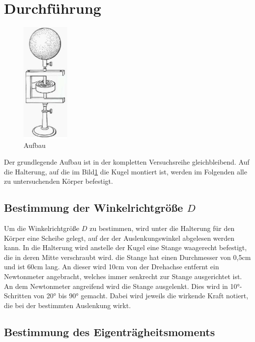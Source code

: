 \section{Durchführung}
\label{sec:Durchführung}

\begin{figure}
    \centering
    \includegraphics[height=6cm]{data/Bild_1}
    \caption{Aufbau}
    \label{fig:aufbau}
\end{figure}

Der grundlegende Aufbau ist in der kompletten Versuchsreihe gleichbleibend. Auf die Halterung, auf die im Bild\ref{fig:aufbau} die Kugel
montiert ist, werden im Folgenden alle zu untersuchenden Körper befestigt. 

\subsection{Bestimmung der Winkelrichtgröße $D$}

Um die Winkelrichtgröße $D$ zu bestimmen, wird unter die Halterung für den Körper eine Scheibe gelegt, auf der der Auslenkungswinkel 
abgelesen werden kann. In die Halterung wird anstelle der Kugel eine Stange waagerecht befestigt, die in deren Mitte verschraubt wird.
die Stange hat einen Durchmesser von 0,5$\si{\centi\meter}$ und ist 60$\si{\centi\meter}$ lang. An dieser wird 10$\si{\centi\meter}$
von der Drehachse entfernt ein Newtonmeter angebracht, welches immer senkrecht zur Stange ausgerichtet ist. An dem Newtonmeter 
angreifend wird die Stange ausgelenkt. Dies wird in 10$\si{\degree}$-Schritten von 20$\si{\degree}$ bis 90$\si{\degree}$ gemacht.
Dabei wird jeweils die wirkende Kraft notiert, die bei der bestimmten Auslenkung wirkt. 

\subsection{Bestimmung des Eigenträgheitsmoments}

